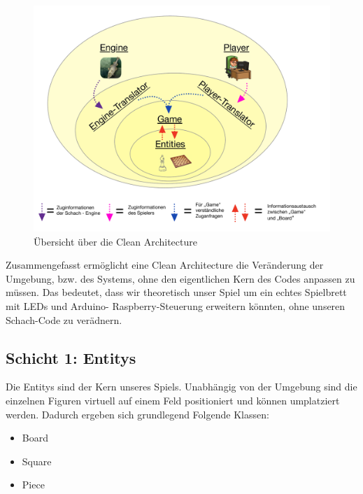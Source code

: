\documentclass[
10pt, %
a4paper, %
oneside, %
headinclude,footinclude, %
BCOR5mm, %
]{scrartcl}
\begin{document}
\begin{figure}[h]
	\begin{center}
		\includegraphics[width = \textwidth]{onion.pdf}
		\caption{Übersicht über die Clean Architecture}
	\end{center}
\end{figure}

Zusammengefasst ermöglicht eine Clean Architecture die Veränderung der Umgebung, bzw. des Systems, ohne den eigentlichen Kern des Codes anpassen zu müssen.
Das bedeutet, dass wir theoretisch unser Spiel um ein echtes Spielbrett mit LEDs und Arduino- Raspberry-Steuerung erweitern könnten, ohne unseren Schach-Code zu verädnern.
\newpage
\subsection{Schicht 1: Entitys}
Die Entitys sind der Kern unseres Spiels. Unabhängig von der Umgebung sind die einzelnen Figuren virtuell auf einem Feld positioniert und können umplatziert werden.
Dadurch ergeben sich grundlegend Folgende Klassen: 

\begin{center}
	\begin{itemize}
		\item Board
		\item Square
		\item Piece
	\end{itemize}
\end{center}
\end{document}
